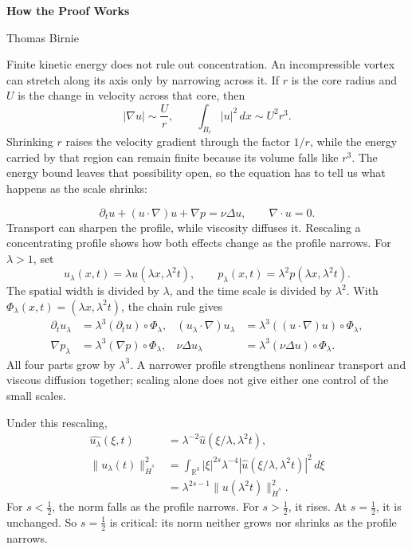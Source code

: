 \documentclass[12pt]{article}
\newcommand{\R}{\mathbb R}
\begin{document}
{\Large\bfseries How the Proof Works\par}
\vspace{0.16\baselineskip}
{\small Thomas Birnie\par}

\vspace{0.55\baselineskip}

Finite kinetic energy does not rule out concentration. An incompressible
vortex can stretch along its axis only by narrowing across it. If \(r\) is
the core radius and \(U\) is the change in velocity across that core, then
\[
  |\nabla u|
  \sim
  \frac{U}{r},
  \qquad
  \int_{B_r}|u|^2\,dx
  \sim
  U^2r^3.
\]
Shrinking \(r\) raises the velocity gradient through the factor \(1/r\), while
the energy carried by that region can remain finite because its volume falls
like \(r^3\). The energy bound leaves that possibility open, so the equation
has to tell us what happens as the scale shrinks:

\[
  \partial_tu
  +
  (u\cdot\nabla)u
  +
  \nabla p
  =
  \nu\Delta u,
  \qquad
  \nabla\cdot u=0.
\]
Transport can sharpen the profile, while viscosity diffuses it. Rescaling a
concentrating profile shows how both effects change as the profile narrows. For
\(\lambda>1\), set
\[
  u_\lambda(x,t)
  =
  \lambda u(\lambda x,\lambda^2t),
  \qquad
  p_\lambda(x,t)
  =
  \lambda^2p(\lambda x,\lambda^2t).
\]
The spatial width is divided by \(\lambda\), and the time scale is divided by
\(\lambda^2\). With
\(\Phi_\lambda(x,t)=(\lambda x,\lambda^2t)\), the chain rule gives
\[
\begin{aligned}
  \partial_tu_\lambda
  &=
  \lambda^3(\partial_tu)\circ\Phi_\lambda,
  &
  (u_\lambda\cdot\nabla)u_\lambda
  &=
  \lambda^3((u\cdot\nabla)u)\circ\Phi_\lambda,
  \\
  \nabla p_\lambda
  &=
  \lambda^3(\nabla p)\circ\Phi_\lambda,
  &
  \nu\Delta u_\lambda
  &=
  \lambda^3(\nu\Delta u)\circ\Phi_\lambda.
\end{aligned}
\]
All four parts grow by \(\lambda^3\). A narrower profile strengthens nonlinear
transport and viscous diffusion together; scaling alone does not give either
one control of the small scales.

Under this rescaling,
\[
\begin{aligned}
  \widehat{u_\lambda}(\xi,t)
  &=
  \lambda^{-2}
  \widehat u(\xi/\lambda,\lambda^2t),
  \\
  \|u_\lambda(t)\|_{\dot H^s}^2
  &=
  \int_{\R^3}
  |\xi|^{2s}\lambda^{-4}
  |\widehat u(\xi/\lambda,\lambda^2t)|^2\,d\xi
  \\
  &=
  \lambda^{2s-1}
  \|u(\lambda^2t)\|_{\dot H^s}^2.
\end{aligned}
\]
For 
\(s<\tfrac12\), the norm falls as the profile narrows. For
\(s>\tfrac12\), it rises. At
\(s=\tfrac12\), it is unchanged. So \(s=\tfrac12\) is critical: its norm
neither grows nor shrinks as the profile narrows.
\end{document}

